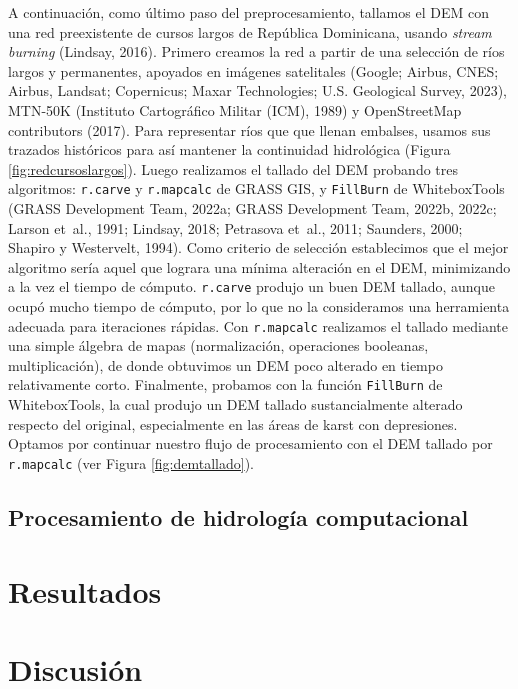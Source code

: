 \documentclass[spanish]{article}
\begin{document}
A continuación, como último paso del preprocesamiento, tallamos el DEM
con una red preexistente de cursos largos de República Dominicana,
usando \emph{stream burning} (Lindsay, 2016). Primero creamos la red a
partir de una selección de ríos largos y permanentes, apoyados en
imágenes satelitales (Google; Airbus, CNES; Airbus, Landsat; Copernicus;
Maxar Technologies; U.S. Geological Survey, 2023), MTN-50K (Instituto
Cartográfico Militar (ICM), 1989) y OpenStreetMap contributors (2017).
Para representar ríos que que llenan embalses, usamos sus trazados
históricos para así mantener la continuidad hidrológica (Figura
\ref{fig:redcursoslargos}). Luego realizamos el tallado del DEM probando
tres algoritmos: \texttt{r.carve} y \texttt{r.mapcalc} de GRASS GIS, y
\texttt{FillBurn} de WhiteboxTools (GRASS Development Team, 2022a; GRASS
Development Team, 2022b, 2022c; Larson et~al., 1991; Lindsay, 2018;
Petrasova et~al., 2011; Saunders, 2000; Shapiro y Westervelt, 1994).
Como criterio de selección establecimos que el mejor algoritmo sería
aquel que lograra una mínima alteración en el DEM, minimizando a la vez
el tiempo de cómputo. \texttt{r.carve} produjo un buen DEM tallado,
aunque ocupó mucho tiempo de cómputo, por lo que no la consideramos una
herramienta adecuada para iteraciones rápidas. Con \texttt{r.mapcalc}
realizamos el tallado mediante una simple álgebra de mapas
(normalización, operaciones booleanas, multiplicación), de donde
obtuvimos un DEM poco alterado en tiempo relativamente corto.
Finalmente, probamos con la función \texttt{FillBurn} de WhiteboxTools,
la cual produjo un DEM tallado sustancialmente alterado respecto del
original, especialmente en las áreas de karst con depresiones. Optamos
por continuar nuestro flujo de procesamiento con el DEM tallado por
\texttt{r.mapcalc} (ver Figura \ref{fig:demtallado}).

\hypertarget{procesamiento-de-hidrologuxeda-computacional}{%
\subsection{Procesamiento de hidrología
computacional}\label{procesamiento-de-hidrologuxeda-computacional}}

\hypertarget{resultados}{%
\section{Resultados}\label{resultados}}

\hypertarget{discusiuxf3n}{%
\section{Discusión}\label{discusiuxf3n}}
\end{document}
